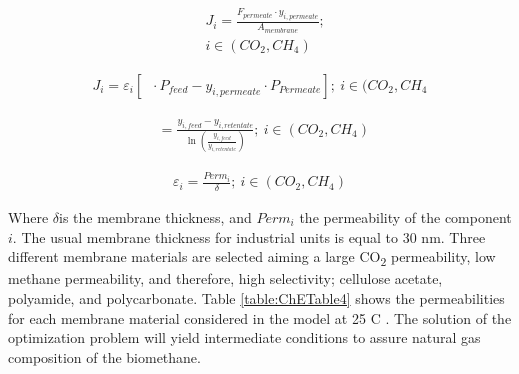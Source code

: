 \begin{refsection}[referencesCh7]
\begin{align}
&{J_i} = \frac{{{F_{permeate}}\cdot{y_{i,permeate}}}}{{{A_{membrane}}}}; \label{eq:ChEEq18} \\
&i \in (CO_{2},CH_{4}) \nonumber
\end{align}

\begin{align}
{J_i} = {\varepsilon _i}\left[ {\mathop {{y_{feedside}}}\limits^{} \cdot{P_{feed}} - {y_{i,permeate}}\cdot P{}_{Permeate}} \right]; \ i \in (CO_{2},CH_{4} \label{eq:ChEEq19}
\end{align}

\begin{align}
\mathop {{y_{feedside}}}\limits^{}  = \frac{{{y_{i,feed}} - {y_{i,retentate}}}}{{\ln \left( {\frac{{{y_{i,feed}}}}{{{y_{i,retentate}}}}} \right)}}; \ i \in (CO_{2},CH_{4}) \label{eq:ChEEq20}
\end{align}

\begin{align}
{\varepsilon _i} = \frac{{Perm_{i}}}{\delta }; \ i \in (CO_{2},CH_{4}) \label{eq:ChEEq21}
\end{align}

Where $\delta$is the membrane thickness, and ${Perm_{i}}$ the permeability of the component $i$. The usual membrane thickness for industrial units is equal to 30 nm. Three different membrane materials are selected aiming a large CO\textsubscript{2} permeability, low methane permeability, and therefore, high selectivity; cellulose acetate, polyamide, and polycarbonate. Table \ref{table:ChETable4} shows the permeabilities for each membrane material considered in the model at 25 \textdegree C \citep{vrbova2017upgrading}. The solution of the optimization problem will yield intermediate conditions to assure natural gas composition of the biomethane.

\begin{table}[h]
	\centering
	\caption{Gases permeability \protect\citep{vrbova2017upgrading}.}
	\label{table:ChETable4}
\end{table}


\end{refsection}
